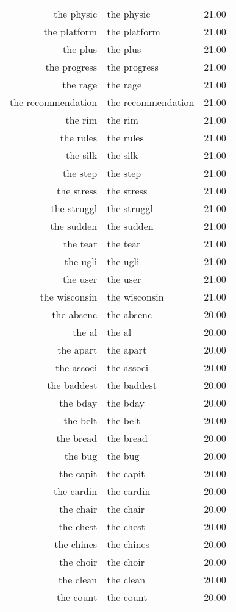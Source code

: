 \begin{table}[ht]
\begin{tabular}{rlr}
  the physic & the physic & 21.00 \\ 
  the platform & the platform & 21.00 \\ 
  the plus & the plus & 21.00 \\ 
  the progress & the progress & 21.00 \\ 
  the rage & the rage & 21.00 \\ 
  the recommendation & the recommendation & 21.00 \\ 
  the rim & the rim & 21.00 \\ 
  the rules & the rules & 21.00 \\ 
  the silk & the silk & 21.00 \\ 
  the step & the step & 21.00 \\ 
  the stress & the stress & 21.00 \\ 
  the struggl & the struggl & 21.00 \\ 
  the sudden & the sudden & 21.00 \\ 
  the tear & the tear & 21.00 \\ 
  the ugli & the ugli & 21.00 \\ 
  the user & the user & 21.00 \\ 
  the wisconsin & the wisconsin & 21.00 \\ 
  the absenc & the absenc & 20.00 \\ 
  the al & the al & 20.00 \\ 
  the apart & the apart & 20.00 \\ 
  the associ & the associ & 20.00 \\ 
  the baddest & the baddest & 20.00 \\ 
  the bday & the bday & 20.00 \\ 
  the belt & the belt & 20.00 \\ 
  the bread & the bread & 20.00 \\ 
  the bug & the bug & 20.00 \\ 
  the capit & the capit & 20.00 \\ 
  the cardin & the cardin & 20.00 \\ 
  the chair & the chair & 20.00 \\ 
  the chest & the chest & 20.00 \\ 
  the chines & the chines & 20.00 \\ 
  the choir & the choir & 20.00 \\ 
  the clean & the clean & 20.00 \\ 
  the count & the count & 20.00 \\ 

\end{tabular}
\end{table}

